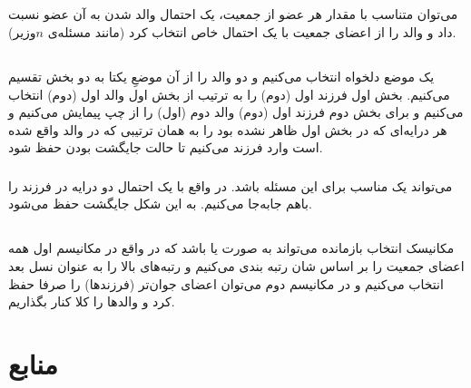 \documentclass{article}
\begin{document}
\subsection{}
می‌توان متناسب با مقدار  هر عضو از جمعیت، یک احتمال والد شدن به آن عضو نسبت داد و والد را از اعضای جمعیت با یک احتمال خاص انتخاب کرد (مانند مسئله‌ی $n$وزیر).
\subsection{}
\subsubsection{}
یک موضع دلخواه انتخاب می‌کنیم و دو والد را از آن موضعِ یکتا به دو بخش تقسیم می‌کنیم. بخش اول فرزند اول (دوم) را به ترتیب از بخش اول والد اول (دوم) انتخاب می‌کنیم و برای بخش دوم فرزند اول (دوم) والد دوم (اول) را از چپ پیمایش می‌کنیم و هر درایه‌ای که در بخش اول ظاهر نشده بود را به همان ترتیبی که در والد واقع شده است وارد فرزند می‌کنیم تا حالت جایگشت بودن حفظ شود.
\subsubsection{}
 می‌تواند یک  مناسب برای این مسئله باشد. در واقع با یک احتمال دو درایه در فرزند را باهم جابه‌جا می‌کنیم. به این شکل جایگشت حفظ می‌شود.
\subsection{}
مکانیسک انتخاب بازمانده می‌تواند به صورت  یا  باشد که در واقع در مکانیسم اول همه اعضای جمعیت را بر اساس شان رتبه بندی می‌کنیم و رتبه‌های بالا را به عنوان نسل بعد انتخاب می‌کنیم و در مکانیسم دوم می‌توان اعضای جوان‌تر (فرزندها) را صرفا حفظ کرد و والدها را کلا کنار بگذاریم.




\section*{منابع}
\renewcommand{\section}[2]{}%
\begin{thebibliography}{99} %


\begin{LTRitems}

\resetlatinfont

\end{LTRitems}

\end{thebibliography}
\end{document}
